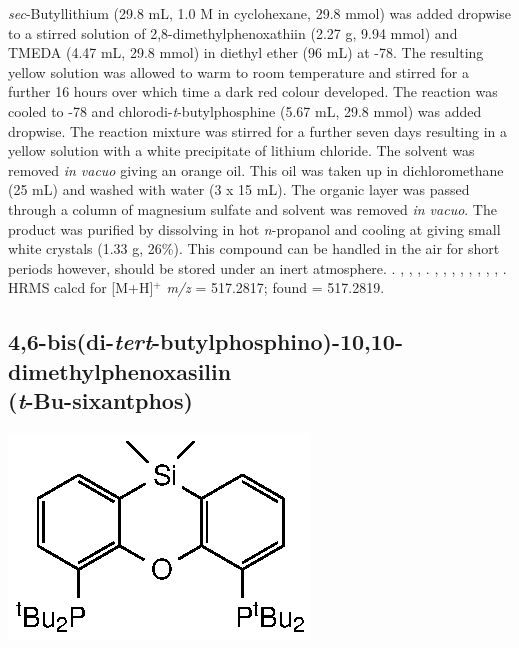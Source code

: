\noindent{}\emph{sec}-Butyllithium (29.8 mL, 1.0 M in cyclohexane, 29.8 mmol) was added dropwise to a stirred solution of 2,8-dimethylphenoxathiin (2.27 g, 9.94 mmol) and TMEDA (4.47 mL, 29.8 mmol) in diethyl ether (96 mL) at -78\degC{}.  The resulting yellow solution was allowed to warm to room temperature and stirred for a further 16 hours over which time a dark red colour developed.  The reaction was cooled to -78\degC{} and chlorodi-\emph{t}-butylphosphine (5.67 mL, 29.8 mmol) was added dropwise.  The reaction mixture was stirred for a further seven days resulting in a yellow solution with a white precipitate of lithium chloride.  The solvent was removed \emph{in vacuo} giving an orange oil.  This oil was taken up in dichloromethane (25 mL) and washed with water (3 x 15 mL).  The organic layer was passed through a column of magnesium sulfate and solvent was removed \emph{in vacuo}.  The product was purified by dissolving in hot \emph{n}-propanol and cooling at  giving small white crystals (1.33 g, 26\%).  This compound can be handled in the air for short periods however, should be stored under an inert atmosphere.
.
,
,
,
.
,
,
,
,
,
,
,
,
.
HRMS calcd for  [M+H]$^+$ \emph{m/z} = 517.2817; found = 517.2819.

\subsection*{4,6-bis(di-\emph{tert}-butylphosphino)-10,10-dimethylphenoxasilin \\(\emph{t}-Bu-sixantphos)}

\begin{structure}[h]
\begin{center}
\includegraphics{../Structures/SitBuligand.eps}
\end{center}
\end{structure}

